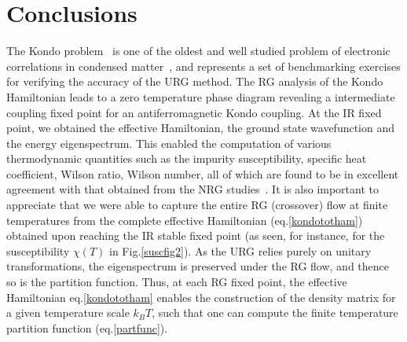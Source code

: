 \documentclass[aps,prb,preprint,groupedaddress]{revtex4-2}
\begin{document}
\section{Conclusions}\label{ConcluKondo}
\pin
The Kondo problem~\cite{kondo1964resistance} is one of the oldest and well studied problem of electronic correlations in condensed matter~\cite{anderson1970poor,wilson1975}, and represents a set of benchmarking exercises for verifying the accuracy of the URG method.  The RG analysis of the Kondo Hamiltonian leads to a zero temperature phase diagram revealing a intermediate coupling fixed point for an antiferromagnetic Kondo coupling. At the IR fixed point, we obtained the effective Hamiltonian, the ground state wavefunction and the energy eigenspectrum. This enabled the computation of various  thermodynamic quantities such as the impurity susceptibility, specific heat coefficient, Wilson ratio, Wilson number, all of which  are found to be in excellent agreement with that obtained from the NRG studies~\cite{bullaNRGreview}. It is also important to appreciate that we were able to capture the entire RG (crossover) flow at finite temperatures from the complete effective Hamiltonian (eq.\eqref{kondototham}) obtained upon reaching the IR stable fixed point (as seen, for instance, for the susceptibility $\chi (T)$ in Fig.\ref{suscfig2}). As the URG relies purely on unitary transformations, the eigenspectrum is preserved under the RG flow, and thence so is the partition function. Thus, at each RG fixed point, the effective Hamiltonian eq.\eqref{kondototham} enables the construction of the density matrix for a given temperature scale $k_{B}T$, such that one can compute the finite temperature partition function (eq.\eqref{partfunc}). 
\pin
\end{document}
